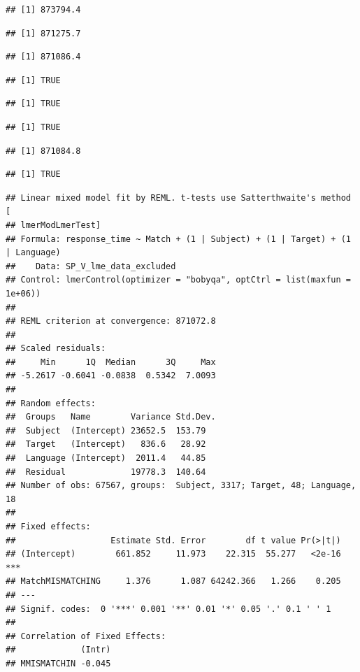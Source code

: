 \documentclass[
  man]{apa6}
\begin{document}
\begin{verbatim}
## [1] 873794.4
\end{verbatim}

\begin{verbatim}
## [1] 871275.7
\end{verbatim}

\begin{verbatim}
## [1] 871086.4
\end{verbatim}

\begin{verbatim}
## [1] TRUE
\end{verbatim}

\begin{verbatim}
## [1] TRUE
\end{verbatim}

\begin{verbatim}
## [1] TRUE
\end{verbatim}

\begin{verbatim}
## [1] 871084.8
\end{verbatim}

\begin{verbatim}
## [1] TRUE
\end{verbatim}

\begin{verbatim}
## Linear mixed model fit by REML. t-tests use Satterthwaite's method [
## lmerModLmerTest]
## Formula: response_time ~ Match + (1 | Subject) + (1 | Target) + (1 | Language)
##    Data: SP_V_lme_data_excluded
## Control: lmerControl(optimizer = "bobyqa", optCtrl = list(maxfun = 1e+06))
## 
## REML criterion at convergence: 871072.8
## 
## Scaled residuals: 
##     Min      1Q  Median      3Q     Max 
## -5.2617 -0.6041 -0.0838  0.5342  7.0093 
## 
## Random effects:
##  Groups   Name        Variance Std.Dev.
##  Subject  (Intercept) 23652.5  153.79  
##  Target   (Intercept)   836.6   28.92  
##  Language (Intercept)  2011.4   44.85  
##  Residual             19778.3  140.64  
## Number of obs: 67567, groups:  Subject, 3317; Target, 48; Language, 18
## 
## Fixed effects:
##                   Estimate Std. Error        df t value Pr(>|t|)    
## (Intercept)        661.852     11.973    22.315  55.277   <2e-16 ***
## MatchMISMATCHING     1.376      1.087 64242.366   1.266    0.205    
## ---
## Signif. codes:  0 '***' 0.001 '**' 0.01 '*' 0.05 '.' 0.1 ' ' 1
## 
## Correlation of Fixed Effects:
##             (Intr)
## MMISMATCHIN -0.045
\end{verbatim}
\end{document}
